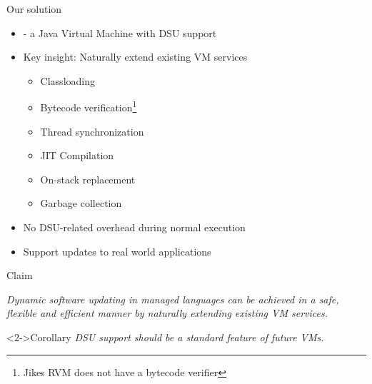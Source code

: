 \begin{frame}{Our solution}%
\begin{itemize}
\item \DSU{} - a Java Virtual Machine with DSU support
\item Key insight: Naturally extend existing VM services
  \begin{itemize}
  \item Classloading
  \item Bytecode verification\footnote{Jikes RVM does not have a bytecode
  verifier}
  \item Thread synchronization
  \item JIT Compilation
  \item On-stack replacement
  \item Garbage collection
  \end{itemize}
\item No DSU-related overhead during normal execution
\item Support updates to real world applications
\end{itemize}
\end{frame}

\begin{frame}{Claim}%
\begin{block}{}
\emph{Dynamic software updating in managed languages can be achieved in a
safe, flexible and efficient manner by naturally extending existing VM
services.}
\end{block}

\begin{block}<2->{Corollary}
\emph{DSU support should be a standard feature of future VMs.}
\end{block}
\end{frame}
